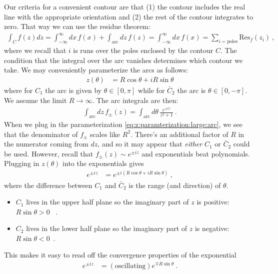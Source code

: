 Our criteria for a convenient contour are that (1) the contour includes the real line with the appropriate orientation and (2) the rest of the contour integrates to zero. That way we can use the residue theorem:
\begin{align}
	\int_C f(z) dz 
	= \int_{-\infty}^\infty dx\, f(x)
	+ \int_{\text{arc}}dz\, f(z) = 
	\int_{-\infty}^\infty dx\, f(x)
	= \sum_{i=\text{poles}}\text{Res}_f(z_i) \ ,
\end{align}
where we recall that $i$ is runs over the poles enclosed by the contour $C$. The condition that the integral over the arc vanishes determines which contour we take. We may conveniently parameterize the arcs as follows:
\begin{align}
	z(\theta) &= R\cos\theta + i R\sin\theta
	\label{eq:z:paramterization:large:arc}
\end{align}
where for $C_1$ the arc is given by $\theta \in [0,\pi]$ while for $\bar C_2$ the arc is $\theta\in[0,-\pi]$. We assume the limit $R\to \infty$. The arc integrals are then:
\begin{align}
	\int_{\text{arc}}
	dz \, 
	f_\pm(z)
	=
	\int_\text{arc}
	d\theta \, 
	\frac{e^{\pm iz}}{z^2+1}
	\ .
\end{align}
When we plug in the parameterization \eqref{eq:z:paramterization:large:arc}, we see that the denominator of $f_\pm$ scales like $R^2$. There's an additional factor of $R$ in the numerator coming from $dz$, and so it may  appear that \emph{either} $C_1$ or $\bar C_2$ could be used. However, recall that $f_{\pm}(z)\sim e^{\pm iz}$ and exponentials beat polynomials. Plugging in $z(\theta)$ into the exponentials gives
\begin{align}
	e^{\pm iz} &= e^{\pm i\left(R\cos\theta + i R\sin\theta\right)} \ ,
\end{align}
where the difference between $C_1$ and $\bar C_2$ is the range (and direction) of $\theta$.
\begin{itemize}
	\item $C_1$ lives in the upper half plane so the imaginary part of $z$ is positive: $R\sin\theta > 0$ \ .
	\item $C_2$ lives in the lower half plane so the imaginary part of $z$ is negative: $R\sin\theta < 0$\ .	
\end{itemize}
This makes it easy to read off the convergence properties of the exponential
\begin{align}
	e^{\pm iz} &= (\text{oscillating})e^{\mp R\sin\theta} \ .
\end{align}
